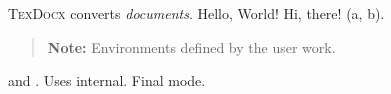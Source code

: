 \documentclass{article}
\makeatletter
\newcommand{\project}{\textsc{TexDocx}}
\newcommand{\term}[1]{\emph{#1}}
\newcommand{\greet}[2][Hello]{#1, #2!}
\def\pair#1#2{(#1, #2)}
\newenvironment{note}{\begin{quote}\textbf{Note:}}{\end{quote}}
\def\@internal{internal}
\newcommand{\usesinternal}{\@internal}
\newif\ifdraft
\makeatother
\begin{document}
\project{} converts \term{documents}. \greet{World} \greet[Hi]{there} \pair{a}{b}.
\begin{note}
Environments defined by the user work.
\end{note}
 and . Uses \usesinternal.
\ifdraft Draft mode.\else Final mode.\fi
\end{document}

